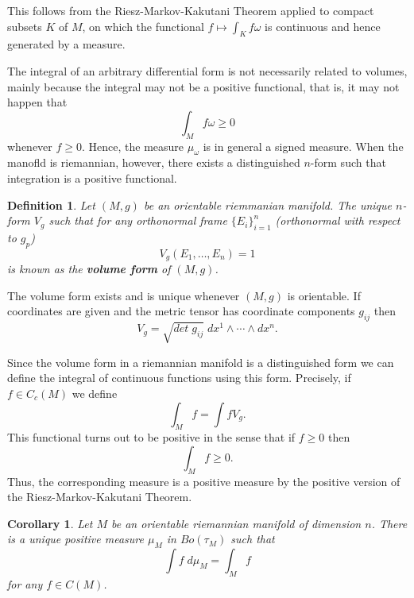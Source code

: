 \documentclass[%
 aip,
 amsmath,amssymb,
 reprint,%
jmp]{revtex4-2}
\newtheorem*{definition}{Definition}
\newtheorem{corollary}{Corollary}[section]
\begin{document}
This follows from the Riesz-Markov-Kakutani Theorem applied to compact subsets $K$ of $M$, on which the functional $f\longmapsto \int_{K} f\omega$ is continuous and hence generated by a measure.

The integral of an arbitrary differential form is not necessarily related to volumes, mainly because the integral may not be a positive functional, that is, it may not happen that
\begin{equation*}
    \int_{M} f\omega \geq 0
\end{equation*}
whenever $f \geq 0$. Hence, the measure $\mu_{\omega}$ is in general a signed measure. When the manofld is riemannian, however, there exists a distinguished $n$-form such that integration is a positive functional.

\begin{definition}
Let $(M,g)$ be an orientable riemmanian manifold. The unique $n$-form $V_{g}$ such that for any orthonormal frame $\{E_{i}\}_{i=1}^{n}$ (orthonormal with respect to $g_{p}$)
\begin{equation*}
    V_{g}(E_{1},\ldots,E_{n}) = 1
\end{equation*}
is known as the \textbf{volume form} of $(M,g)$.
\end{definition}

The volume form exists and is unique whenever $(M,g)$ is orientable. If coordinates are given and the metric tensor has coordinate components $g_{ij}$ then
\begin{equation*}
    V_{g} = \sqrt{det\;g_{ij}}\;dx^{1}\wedge \cdots \wedge dx^{n}.
\end{equation*}

Since the volume form in a riemannian manifold is a distinguished form we can define the integral of continuous functions using this form. Precisely, if $f\in C_{c}(M)$ we define
\begin{equation*}
    \int_{M} f = \int fV_{g}.
\end{equation*}
This functional turns out to be positive in the sense that if $f\geq 0$ then
\begin{equation*}
    \int_{M} f \geq 0.
\end{equation*}
Thus, the corresponding measure is a positive measure by the positive version of the Riesz-Markov-Kakutani Theorem.

\begin{corollary}
Let $M$ be an orientable riemannian manifold of dimension $n$. There is a unique positive measure $\mu_{M}$ in $Bo(\tau_{M})$ such that 
\begin{equation*}
    \int f\;d\mu_{M} = \int_{M} f
\end{equation*}
for any $f\in C(M)$.
\end{corollary}
\end{document}
